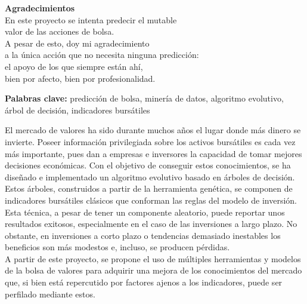 \vskip 4cm

\textbf{Agradecimientos}\\

\noindent En este proyecto se intenta predecir el mutable\\
valor de las acciones de bolsa.\\
A pesar de esto, doy mi agradecimiento\\
a la única acci\'on que no necesita ninguna predicci\'on:\\
el apoyo de los que siempre est\'an ah\'i,\\
bien por afecto, bien por profesionalidad.

\newpage

\begin{resumen}
	\noindent\textbf{Palabras clave:} predicci\'on de bolsa, miner\'ia de datos, algoritmo evolutivo, \'arbol de decisi\'on, indicadores burs\'atiles
	\vspace{1cm}	
		
	El mercado de valores ha sido durante muchos años el lugar donde m\'as dinero se invierte. Poseer informaci\'on privilegiada sobre los activos burs\'atiles es cada vez m\'as importante, pues dan a empresas e inversores la capacidad de tomar mejores decisiones econ\'omicas. Con el objetivo de conseguir estos conocimientos, se ha dise\~nado e implementado un algoritmo evolutivo basado en \'arboles de decisi\'on. Estos \'arboles, construidos a partir de la herramienta gen\'etica, se componen de indicadores burs\'atiles cl\'asicos que conforman las reglas del modelo de inversi\'on.\\
	
	Esta t\'ecnica, a pesar de tener un componente aleatorio, puede reportar unos resultados exitosos, especialmente en el caso de las inversiones a largo plazo. No obstante, en inversiones a corto plazo o tendencias demasiado inestables los beneficios son m\'as modestos e, incluso, se producen p\'erdidas.\\
	
	A partir de este proyecto, se propone el uso de m\'ultiples herramientas y modelos de la bolsa de valores para adquirir una mejora de los conocimientos del mercado que, si bien est\'a repercutido por factores ajenos a los indicadores, puede ser perfilado mediante estos.
\end{resumen}

